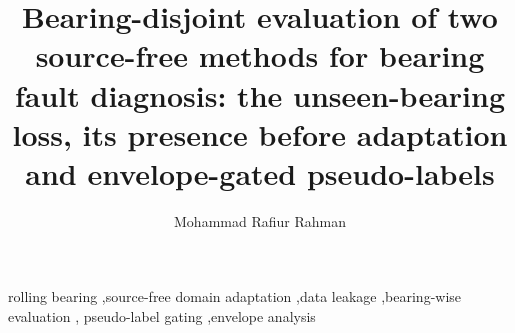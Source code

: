 \documentclass[preprint,3p,times]{elsarticle}
\begin{document}
\begin{frontmatter}

\title{Bearing-disjoint evaluation of two source-free methods for bearing fault diagnosis: the unseen-bearing loss, its presence before adaptation and envelope-gated pseudo-labels}

\author[a]{Mohammad Rafiur Rahman}
\address[a]{Department of Mechanical Engineering, Chittagong University of Engineering \& Technology (CUET), Chattogram 4349, Bangladesh}

\begin{abstract}

\end{abstract}

\begin{keyword}
rolling bearing \sep source-free domain adaptation \sep data leakage \sep bearing-wise evaluation \sep
pseudo-label gating \sep envelope analysis
\end{keyword}

\end{frontmatter}















\end{document}
